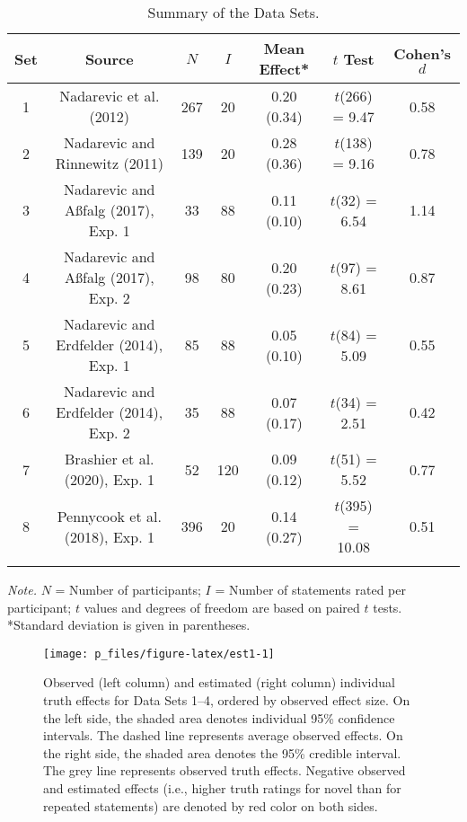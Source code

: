 \documentclass[
  english,
  ,man,floatsintext]{apa6}
\begin{document}
\begin{table}[tbp]

\begin{center}
\begin{threeparttable}

\captionsetup{font=normalsize,labelfont=normalsize}
\caption{\label{tab:descriptives}Summary of the Data Sets.}

\begin{tabular}{ccccccc}
\toprule
Set & Source & $N$ & $I$ & Mean Effect* & $t$ Test & Cohen's $d$\\
\midrule
1 & Nadarevic et al. (2012) & 267 & 20 & 0.20 (0.34) & $t$(266) = 9.47 & 0.58\\
2 & Nadarevic and Rinnewitz (2011) & 139 & 20 & 0.28 (0.36) & $t$(138) = 9.16 & 0.78\\
3 & Nadarevic and A{\ss}falg (2017), Exp. 1 & 33 & 88 & 0.11 (0.10) & $t$(32) = 6.54 & 1.14\\
4 & Nadarevic and A{\ss}falg (2017), Exp. 2 & 98 & 80 & 0.20 (0.23) & $t$(97) = 8.61 & 0.87\\
5 & Nadarevic and Erdfelder (2014), Exp. 1 & 85 & 88 & 0.05 (0.10) & $t$(84) = 5.09 & 0.55\\
6 & Nadarevic and Erdfelder (2014), Exp. 2 & 35 & 88 & 0.07 (0.17) & $t$(34) = 2.51 & 0.42\\
7 & Brashier et al. (2020), Exp. 1 & 52 & 120 & 0.09 (0.12) & $t$(51) = 5.52 & 0.77\\
8 & Pennycook et al. (2018), Exp. 1 & 396 & 20 & 0.14 (0.27) & $t$(395) = 10.08 & 0.51\\
\bottomrule
\addlinespace
\end{tabular}

\begin{tablenotes}[para]
\normalsize{\textit{Note.} $N$ = Number of participants; $I$ = Number of statements rated per participant; $t$ values and degrees of freedom are based on paired $t$ tests. *Standard deviation is given in parentheses.}
\end{tablenotes}

\end{threeparttable}
\end{center}

\end{table}

\begin{figure}
\texttt{[image: p\_files/figure-latex/est1-1]} \caption{Observed (left column) and estimated (right column) individual truth effects for Data Sets 1--4, ordered by observed effect size. On the left side, the shaded area denotes individual 95\% confidence intervals. The dashed line represents average observed effects. On the right side, the shaded area denotes the 95\% credible interval. The grey line represents observed truth effects. Negative observed and estimated effects (i.e., higher truth ratings for novel than for repeated statements) are denoted by red color on both sides.}\label{fig:est1}
\end{figure}
\end{document}
